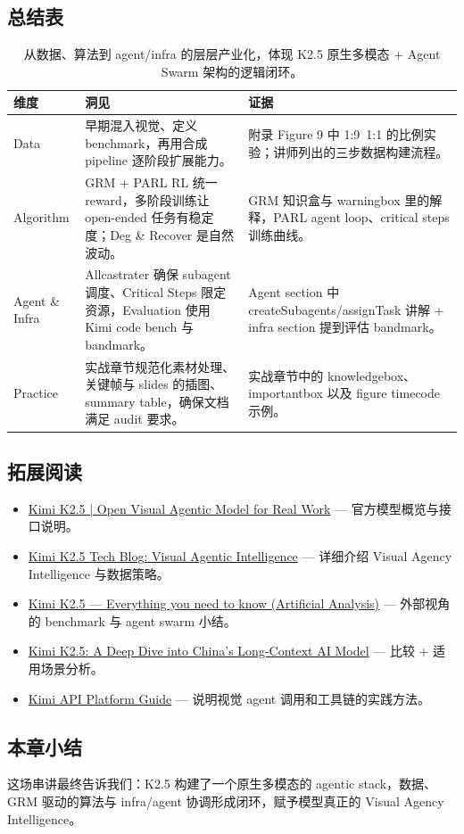 \documentclass[a4paper]{article}
\begin{document}
\subsection{总结表}
\begin{table}[H]
\footnotesize
\centering
\begin{tabular}{p{3cm}p{7cm}p{4cm}}
\toprule
维度 & 洞见 & 证据 \\
\midrule
Data & 早期混入视觉、定义 benchmark，再用合成 pipeline 逐阶段扩展能力。 & 附录 Figure 9 中 1:9~1:1 的比例实验；讲师列出的三步数据构建流程。 \\
Algorithm & GRM + PARL RL 统一 reward，多阶段训练让 open-ended 任务有稳定度；Deg \& Recover 是自然波动。 & GRM 知识盒与 warningbox 里的解释，PARL agent loop、critical steps 训练曲线。 \\
Agent \& Infra & Allcastrater 确保 subagent 调度、Critical Steps 限定资源，Evaluation 使用 Kimi code bench 与 bandmark。 & Agent section 中 createSubagents/assignTask 讲解 + infra section 提到评估 bandmark。 \\
Practice & 实战章节规范化素材处理、关键帧与 slides 的插图、summary table，确保文档满足 audit 要求。 & 实战章节中的 knowledgebox、importantbox 以及 figure timecode 示例。 \\
\bottomrule
\end{tabular}
\caption{从数据、算法到 agent/infra 的层层产业化，体现 K2.5 原生多模态 + Agent Swarm 架构的逻辑闭环。}
\end{table}

\subsection{拓展阅读}
\begin{itemize}
    \item \href{https://www.kimi.com/ai-models/kimi-k2-5/}{Kimi K2.5 | Open Visual Agentic Model for Real Work} — 官方模型概览与接口说明。
    \item \href{https://www.kimi.com/blog/kimi-k2-5}{Kimi K2.5 Tech Blog: Visual Agentic Intelligence} — 详细介绍 Visual Agency Intelligence 与数据策略。
    \item \href{https://artificialanalysis.ai/articles/kimi-k2-5-everything-you-need-to-know}{Kimi K2.5 — Everything you need to know (Artificial Analysis)} — 外部视角的 benchmark 与 agent swarm 小结。
    \item \href{https://futuretechdiaries.com/article.php?slug=kimi-k2-5-a-deep-dive-into-chinas-long-context-ai-model}{Kimi K2.5: A Deep Dive into China’s Long-Context AI Model} — 比较 + 适用场景分析。
    \item \href{https://platform.kimi.ai/docs/guide}{Kimi API Platform Guide} — 说明视觉 agent 调用和工具链的实践方法。
\end{itemize}

\subsection{本章小结}
这场串讲最终告诉我们：K2.5 构建了一个原生多模态的 agentic stack，数据、GRM 驱动的算法与 infra/agent 协调形成闭环，赋予模型真正的 Visual Agency Intelligence。
\end{document}
